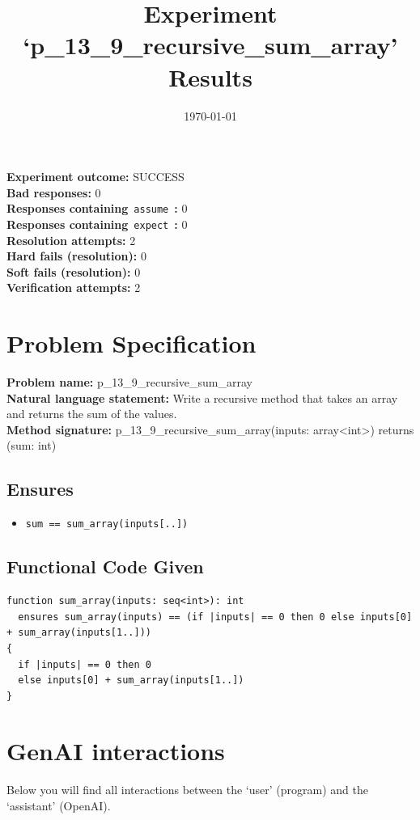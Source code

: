 \documentclass{article}
\begin{document}
\title{Experiment `p\_13\_9\_recursive\_sum\_array' Results}
\author{\today}
\date{}
\maketitle
\textbf{Experiment outcome: }SUCCESS
\\\textbf{Bad responses: }0
\\\textbf{Responses containing}~\texttt{assume}~\textbf{: }0
\\\textbf{Responses containing}~\texttt{expect}~\textbf{: }0
\\\textbf{Resolution attempts: }2
\\\textbf{Hard fails (resolution): }0
\\\textbf{Soft fails (resolution): }0
\\\textbf{Verification attempts: }2
\section*{Problem Specification}
\textbf{Problem name: }p\_13\_9\_recursive\_sum\_array
\\\textbf{Natural language statement: }Write a recursive method that takes an array and returns the sum of the values.
\\\textbf{Method signature: }p\_13\_9\_recursive\_sum\_array(inputs: array<int>) returns (sum: int)
\subsection*{Ensures}
\begin{itemize}
\item \texttt{sum == sum\_array(inputs[..])}
\end{itemize}
\subsection*{Functional Code Given}
\begin{lstlisting}
function sum_array(inputs: seq<int>): int
  ensures sum_array(inputs) == (if |inputs| == 0 then 0 else inputs[0] + sum_array(inputs[1..]))
{
  if |inputs| == 0 then 0
  else inputs[0] + sum_array(inputs[1..])
}
\end{lstlisting}
\clearpage
\section*{GenAI interactions}
Below you will find all interactions between the `user' (program) and the `assistant' (OpenAI).
\end{document}
